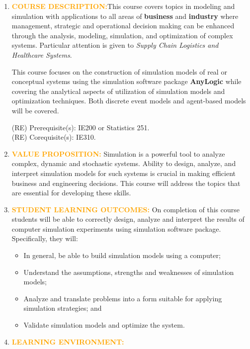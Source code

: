 \documentclass{article}
\begin{document}
\begin{enumerate}

\item \textcolor{orange}{\bf COURSE DESCRIPTION:}This course covers  topics 
in modeling and simulation with applications to all areas of \textbf{business} and \textbf{industry} 
where management, strategic and operational decision making can be enhanced
 through the analysis, modeling, simulation, and optimization of complex systems. 
 Particular attention is given to \textit{Supply Chain Logistics and Healthcare Systems}. 
 
This course focuses on the construction of simulation models of real or
  conceptual systems using the simulation software package \textbf{AnyLogic} 
  while covering the analytical aspects of utilization of simulation models
   and optimization techniques. Both discrete event models and agent-based 
   models will be covered.
   
(RE) Prerequisite(s): IE200 or Statistics 251.\\
(RE) Corequisite(s): IE310.

\item \textcolor{orange}{\bf VALUE PROPOSITION:} Simulation is a powerful tool
to analyze complex, dynamic and stochastic systems.  Ability to design, analyze, and
interpret simulation models for such systems is crucial in making efficient business and
  engineering decisions. This course will address the topics that are
  essential for developing these skills.

\item \textcolor{orange}{\bf STUDENT LEARNING OUTCOMES:} On completion of this course
 students will be able to correctly design, analyze and interpret the results
  of computer simulation experiments using simulation software package. Specifically, they will: 
  \begin{itemize}
\item In general, be able to build simulation models using a computer;
\item Understand the assumptions, strengths and weaknesses of
simulation models;
\item Analyze and translate problems into a form suitable for applying simulation strategies; and 
\item Validate simulation models and optimize the system.
\end{itemize}


\item	\textcolor{orange}{\bf LEARNING ENVIRONMENT:} 


\end{enumerate}
\end{document}

